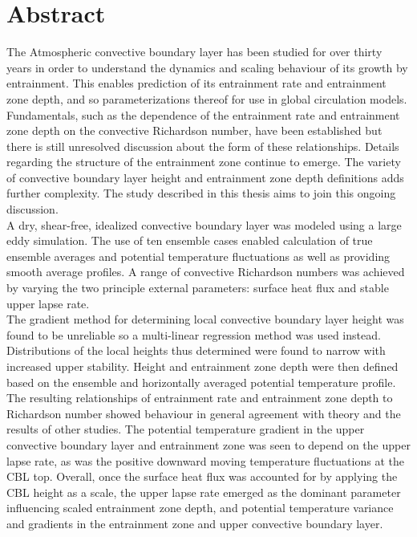 
\chapter{Abstract}
\setlength{\parindent}{0cm}
The Atmospheric convective boundary layer has been studied for over thirty years in order to understand the dynamics and scaling behaviour of its growth by entrainment.  This enables prediction of its entrainment rate and entrainment zone depth, and so parameterizations thereof for use in global circulation models.\\

Fundamentals, such as the dependence of the entrainment rate and entrainment zone depth on the convective Richardson number, have been established but there is still unresolved discussion about the form of these relationships.  Details regarding the structure of the entrainment zone continue to emerge.  The variety of convective boundary layer height and entrainment zone depth definitions adds further complexity.  The study described in this thesis aims to join this ongoing discussion.\\

A dry, shear-free, idealized convective boundary layer was modeled using a large eddy simulation.  The use of ten ensemble cases enabled calculation of true ensemble averages and potential temperature fluctuations as well as providing smooth average profiles.  A range of convective Richardson numbers was achieved by varying the two principle external parameters: surface heat flux and stable upper lapse rate.\\

The gradient method for determining local convective boundary layer height was found to be unreliable so a multi-linear regression method was used instead.  Distributions of the local heights thus determined were found to narrow with increased upper stability.  Height and entrainment zone depth were then defined based on the ensemble and horizontally averaged potential temperature profile.  The resulting relationships of entrainment rate and entrainment zone depth to Richardson number showed behaviour in general agreement with theory and the results of other studies.  The potential temperature gradient in the upper convective boundary layer and entrainment zone was seen to depend on the upper lapse rate, as was the positive downward moving temperature fluctuations at the \acs{CBL} top.  Overall, once the surface heat flux was accounted for by applying the \acs{CBL} height as a scale, the upper lapse rate emerged as the dominant parameter influencing scaled entrainment zone depth, and potential temperature variance and gradients in the entrainment zone and upper convective boundary layer.   

